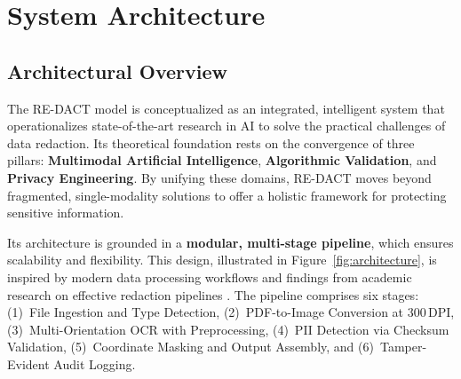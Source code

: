\documentclass[conference]{IEEEtran}
\begin{document}
\section{System Architecture}

\subsection{Architectural Overview}
The RE-DACT model is conceptualized as an integrated, intelligent system that operationalizes state-of-the-art research in AI to solve the practical challenges of data redaction. Its theoretical foundation rests on the convergence of three pillars: \textbf{Multimodal Artificial Intelligence}, \textbf{Algorithmic Validation}, and \textbf{Privacy Engineering}. By unifying these domains, RE-DACT moves beyond fragmented, single-modality solutions to offer a holistic framework for protecting sensitive information.

Its architecture is grounded in a \textbf{modular, multi-stage pipeline}, which ensures scalability and flexibility. This design, illustrated in Figure~\ref{fig:architecture}, is inspired by modern data processing workflows and findings from academic research on effective redaction pipelines \cite{b16}. The pipeline comprises six stages: (1)~File Ingestion and Type Detection, (2)~PDF-to-Image Conversion at 300\,DPI, (3)~Multi-Orientation OCR with Preprocessing, (4)~PII Detection via Checksum Validation, (5)~Coordinate Masking and Output Assembly, and (6)~Tamper-Evident Audit Logging.
\end{document}

